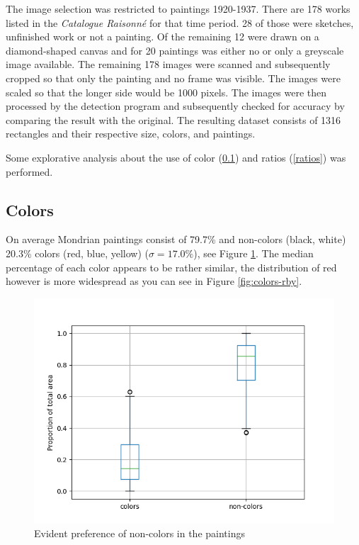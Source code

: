 \documentclass[serif,article,noparskip]{agse-thesis}
\begin{document}
 The image selection was restricted to paintings 1920-1937. There are 178 works
 listed in the \textit{Catalogue Raisonn{\'e}} \cite{joosten1998} for that time
 period. 28 of those were sketches, unfinished work or not a painting. Of the
 remaining 12 were drawn on a diamond-shaped canvas and for 20 paintings was
 either no or only a greyscale image available. The remaining 178 images were
 scanned and subsequently cropped so that only the painting and no frame was
 visible.  The images were scaled so that the longer side would be 1000
 pixels. The images were then processed by the detection program and subsequently
 checked for accuracy by comparing the result with the original. The resulting
 dataset consists of 1316 rectangles and their respective size, colors, and
 paintings.

Some explorative analysis about the use of color (\ref{color}) and ratios
(\ref{ratios}) was performed.

\subsection{Colors} \label{color}

On average Mondrian paintings consist of 79.7\%  and non-colors (black, white)
20.3\% colors (red, blue, yellow) ($\sigma = 17.0\%$), see Figure
\ref{fig:colors-noncolors}. The median percentage of each color appears to be
rather similar, the distribution of red however is more widespread as you can
see in Figure \ref{fig:colors-rby}.

\begin{figure}
\includegraphics[width=\linewidth]{images/colors-non-colors.png}
\caption{Evident preference of non-colors in the paintings}
\label{fig:colors-noncolors}
\end{figure}
\end{document}
